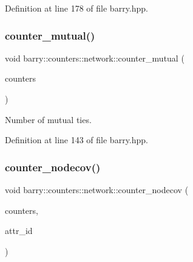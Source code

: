 Definition at line 178 of file barry.\+hpp.

\mbox{\label{namespacebarry_1_1counters_1_1network_afc4086d5788c8d5fa60ec529d9fa15dd}} 
\subsubsection{\texorpdfstring{counter\+\_\+mutual()}{counter\_mutual()}}
{\footnotesize\ttfamily void barry\+::counters\+::network\+::counter\+\_\+mutual (\begin{DoxyParamCaption}\item[{\hyperlink{namespacebarry_1_1counters_1_1network_a3b3c590303d47840d1967372ae495d95}{Net\+Counter\+Vector} $\ast$}]{counters }\end{DoxyParamCaption})\hspace{0.3cm}{\ttfamily [inline]}}



Number of mutual ties. 



Definition at line 143 of file barry.\+hpp.

\mbox{\label{namespacebarry_1_1counters_1_1network_a7087c6419195bc768c1e8c7730757d2e}} 
\subsubsection{\texorpdfstring{counter\+\_\+nodecov()}{counter\_nodecov()}}
{\footnotesize\ttfamily void barry\+::counters\+::network\+::counter\+\_\+nodecov (\begin{DoxyParamCaption}\item[{\hyperlink{namespacebarry_1_1counters_1_1network_a3b3c590303d47840d1967372ae495d95}{Net\+Counter\+Vector} $\ast$}]{counters,  }\item[{\hyperlink{namespacebarry_a11dfc53ddb4672278319aa04f1e09a6c}{uint}}]{attr\+\_\+id }\end{DoxyParamCaption})\hspace{0.3cm}{\ttfamily [inline]}}



